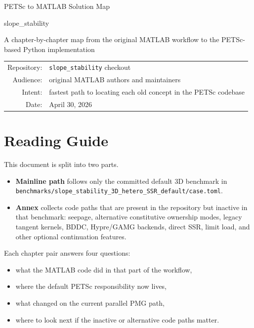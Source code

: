 \documentclass[11pt,a4paper]{report}
\newcommand{\code}[1]{\nolinkurl{#1}}
\begin{document}
\begin{titlepage}
\centering
{\Large PETSc to MATLAB Solution Map\par}
\vspace{0.7cm}
{\large slope\_stability\par}
\vspace{1.2cm}
{\large A chapter-by-chapter map from the original MATLAB workflow to the PETSc-based Python implementation\par}
\vfill
\begin{tabular}{rl}
Repository: & \code{slope\_stability} checkout \\
Audience: & original MATLAB authors and maintainers \\
Intent: & fastest path to locating each old concept in the PETSc codebase \\
Date: & April 30, 2026 \\
\end{tabular}
\vfill
\end{titlepage}

\chapter*{Reading Guide}
This document is split into two parts.
\begin{itemize}
\item \textbf{Mainline path} follows only the committed default 3D benchmark in \code{benchmarks/slope\_stability\_3D\_hetero\_SSR\_default/case.toml}.
\item \textbf{Annex} collects code paths that are present in the repository but inactive in that benchmark: seepage, alternative constitutive ownership modes, legacy tangent kernels, BDDC, Hypre/GAMG backends, direct SSR, limit load, and other optional continuation features.
\end{itemize}

Each chapter pair answers four questions:
\begin{itemize}
\item what the MATLAB code did in that part of the workflow,
\item where the default PETSc responsibility now lives,
\item what changed on the current parallel PMG path,
\item where to look next if the inactive or alternative code paths matter.
\end{itemize}
\end{document}
